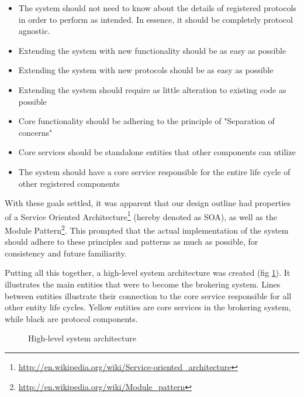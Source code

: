 \begin{itemize}
\item The system should not need to know about the details of registered protocols in order to perform as intended. In essence, it should be completely protocol agnostic.
\item Extending the system with new functionality should be as easy as possible
\item Extending the system with new protocols should be as easy as possible
\item Extending the system should require as little alteration to existing code as possible
\item Core functionality should be adhering to the principle of "Separation of concerns"
\item Core services should be standalone entities that other components can utilize
\item The system should have a core service responsible for the entire life cycle of other registered components
\end{itemize}

With these goals settled, it was apparent that our design outline had properties of a Service Oriented Architecture\footnote{\url{http://en.wikipedia.org/wiki/Service-oriented_architecture}} (hereby denoted as SOA), as well as the Module Pattern\footnote{\url{http://en.wikipedia.org/wiki/Module_pattern}}. This prompted that the actual implementation of the system should adhere to these principles and patterns as much as possible, for consistency and future familiarity.

Putting all this together, a high-level system architecture was created (fig \ref{fig:abstract_architecture}). It illustrates the main entities that were to become the brokering system. Lines between entities illustrate their connection to the core service responsible for all other entity life cycles. Yellow entities are core services in the brokering system, while black are protocol components.

\begin{center}
  \begin{figure}[ht!]
    \caption{High-level system architecture}
    \label{fig:abstract_architecture}
  \end{figure}
\end{center}

